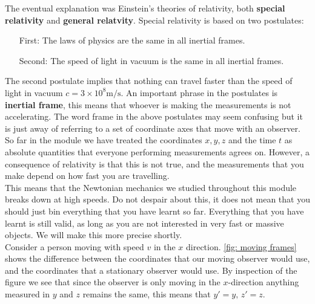 \documentclass[a4paper,12pt]{book}
\begin{document}
The eventual explanation was Einstein's theories of relativity, both \textbf{special relativity} and \textbf{general relatvity}.  Special relativity is based on two postulates:
\begin{itemize}
\setlength{\itemsep}{-5pt}
    \item[First:] The laws of physics are the same in all inertial frames.
    \item[Second:] The speed of light in vacuum is the same in all inertial frames.
\end{itemize}  

The second postulate implies that nothing can travel faster than the speed of light in vacuum $c=3\times 10^{8}\text{m/s}$. An important phrase in the postulates is \textbf{inertial frame}, this means that whoever is making the measurements is not accelerating. The word frame in the above postulates may seem confusing but it is just away of referring to a set of coordinate axes that move with an observer. So far in the module we have treated the coordinates $x,y,z$ and the time $t$ as absolute quantities that everyone performing measurements agrees on. However, a consequence of relativity is that this is not true, and the measurements that you make depend on how fast you are travelling.\\

This means that the Newtonian mechanics we studied throughout this module breaks down at high speeds. Do not despair about this, it does not mean that you should just bin everything that you have learnt so far. Everything that you have learnt is still valid, as long as you are not interested in very fast or massive objects. We will make this more precise shortly.\\

Consider a person moving with speed $v$ in the $x$ direction. \cref{fig: moving frames} shows the difference between the coordinates that our moving observer would use, and the coordinates that a stationary observer would use. By inspection of the figure we see that since the observer is only moving in the $x$-direction anything measured in $y$ and $z$ remains the same, this means that $y'=y,\,z'=z$.\\
\end{document}
